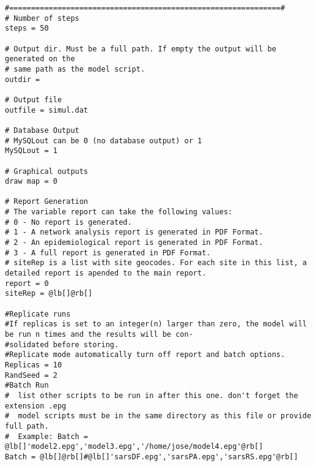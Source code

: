 \documentclass[a4paper,10pt]{manual}
\begin{document}
\begin{Verbatim}[commandchars=@\[\]]
#==============================================================#
# Number of steps
steps = 50

# Output dir. Must be a full path. If empty the output will be generated on the
# same path as the model script.
outdir =

# Output file
outfile = simul.dat

# Database Output
# MySQLout can be 0 (no database output) or 1
MySQLout = 1

# Graphical outputs
draw map = 0

# Report Generation
# The variable report can take the following values:
# 0 - No report is generated.
# 1 - A network analysis report is generated in PDF Format.
# 2 - An epidemiological report is generated in PDF Format.
# 3 - A full report is generated in PDF Format.
# siteRep is a list with site geocodes. For each site in this list, a detailed report is apended to the main report.
report = 0
siteRep = @lb[]@rb[]

#Replicate runs
#If replicas is set to an integer(n) larger than zero, the model will be run n times and the results will be con-
#solidated before storing.
#Replicate mode automatically turn off report and batch options.
Replicas = 10
RandSeed = 2
#Batch Run
#  list other scripts to be run in after this one. don't forget the extension .epg
#  model scripts must be in the same directory as this file or provide full path.
#  Example: Batch = @lb[]'model2.epg','model3.epg','/home/jose/model4.epg'@rb[]
Batch = @lb[]@rb[]#@lb[]'sarsDF.epg','sarsPA.epg','sarsRS.epg'@rb[]
\end{Verbatim}
\end{document}
